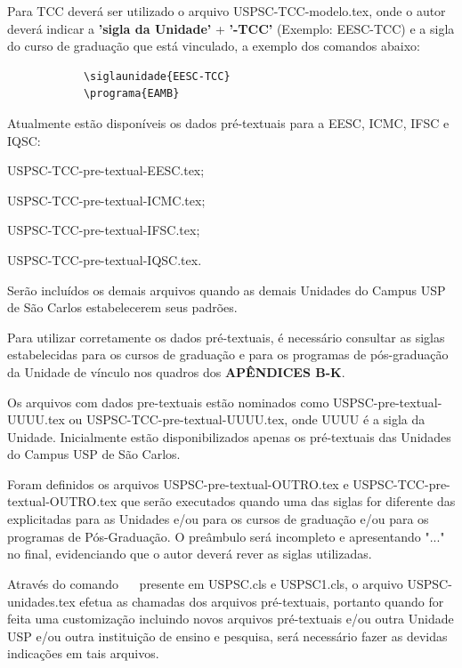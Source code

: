 Para TCC deverá ser utilizado o arquivo USPSC-TCC-modelo.tex, onde o autor deverá indicar a \textbf{'sigla da Unidade'} + \textbf{'-TCC'} (Exemplo: EESC-TCC) e a sigla do curso de graduação que está vinculado, a exemplo dos comandos abaixo:
			
			\begin{verbatim}
			\siglaunidade{EESC-TCC}
			\programa{EAMB}
			\end{verbatim}
			
Atualmente estão disponíveis os dados pré-textuais para a EESC, ICMC, IFSC e IQSC:
			
			\begin{alineas}	 
				\item USPSC-TCC-pre-textual-EESC.tex;
				\item USPSC-TCC-pre-textual-ICMC.tex;
				\item USPSC-TCC-pre-textual-IFSC.tex;
				\item USPSC-TCC-pre-textual-IQSC.tex.
			\end{alineas}
			
Serão incluídos os demais arquivos quando as demais Unidades do Campus USP de São Carlos estabelecerem seus padrões. 
			
Para utilizar corretamente os dados pré-textuais, é necessário consultar as siglas estabelecidas para os cursos de graduação e para os programas de pós-graduação da Unidade de vínculo nos quadros dos \textbf{APÊNDICES B-K}. 

Os arquivos com dados pre-textuais estão nominados como USPSC-pre-textual-UUUU.tex ou USPSC-TCC-pre-textual-UUUU.tex, onde UUUU é a sigla da Unidade. Inicialmente estão disponibilizados apenas os pré-textuais das Unidades do Campus USP de São Carlos.
			
Foram definidos os arquivos USPSC-pre-textual-OUTRO.tex e USPSC-TCC-pre-textual-OUTRO.tex que serão executados quando uma das siglas for diferente das explicitadas para as Unidades e/ou para os cursos de graduação e/ou para os programas de Pós-Graduação. O preâmbulo será incompleto e apresentando "..." no final, evidenciando que o autor deverá rever as siglas utilizadas.

Através do comando \verb+  + presente em USPSC.cls e USPSC1.cls,  o arquivo USPSC-unidades.tex efetua as chamadas dos arquivos pré-textuais, portanto quando for feita uma customização incluindo novos arquivos pré-textuais e/ou outra Unidade USP e/ou outra instituição de ensino e pesquisa, será necessário fazer as devidas indicações em tais arquivos. 
	 
